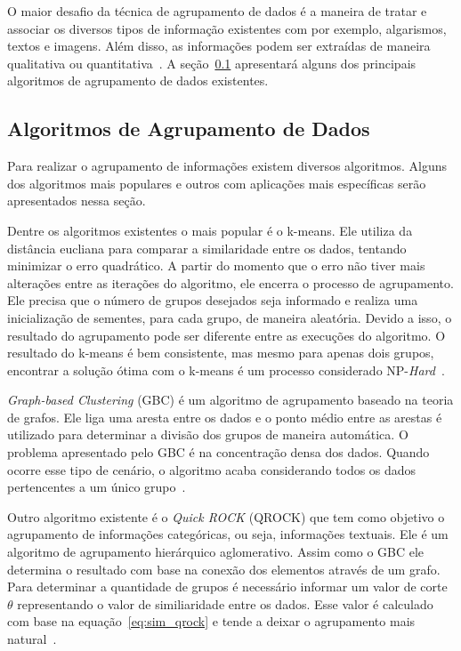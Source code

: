 O maior desafio da técnica de agrupamento de dados é a maneira de tratar e associar os diversos tipos de informação existentes com por exemplo, algarismos, textos e imagens. Além disso, as informações podem ser extraídas de maneira qualitativa ou quantitativa~\cite{witten:2011}. A seção~\ref{sec:algoritmosclustering} apresentará alguns dos principais algoritmos de agrupamento de dados existentes.

\subsection{Algoritmos de Agrupamento de Dados}
\label{sec:algoritmosclustering}
Para realizar o agrupamento de informações existem diversos algoritmos. Alguns dos algoritmos mais populares e outros com aplicações mais específicas serão apresentados nessa seção.

Dentre os algoritmos existentes o mais popular é o k-means. Ele utiliza da distância eucliana para comparar a similaridade entre os dados, tentando minimizar o erro quadrático. A partir do momento que o erro não tiver mais alterações entre as iterações do algoritmo, ele encerra o processo de agrupamento. Ele precisa que o número de grupos desejados seja informado e realiza uma inicialização de sementes, para cada grupo, de maneira aleatória. Devido a isso, o resultado do agrupamento pode ser diferente entre as execuções do algoritmo. O resultado do k-means é bem consistente, mas mesmo para apenas dois grupos, encontrar a solução ótima com o k-means é um processo considerado NP-\emph{Hard}~\cite{jain:2010, witten:2011}.

\emph{Graph-based Clustering} (GBC) é um algoritmo de agrupamento baseado na teoria de grafos. Ele liga uma aresta entre os dados e o ponto médio entre as arestas é utilizado para determinar a divisão dos grupos de maneira automática. O problema apresentado pelo GBC é na concentração densa dos dados. Quando ocorre esse tipo de cenário, o algoritmo acaba considerando todos os dados pertencentes a um único grupo~\cite{muhlenbach:2009}.

Outro algoritmo existente é o \emph{Quick ROCK} (QROCK) que tem como objetivo o agrupamento de informações categóricas, ou seja, informações textuais. Ele é um algoritmo de agrupamento hierárquico aglomerativo. Assim como o GBC ele determina o resultado com base na conexão dos elementos através de um grafo. Para determinar a quantidade de grupos é necessário informar um valor de corte $\theta$ representando o valor de similiaridade entre os dados. Esse valor é calculado com base na equação~\ref{eq:sim_qrock} e tende a deixar o agrupamento mais natural~\cite{dutta:2005}.

